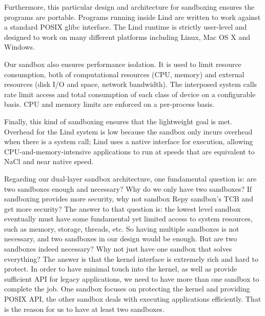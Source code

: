 Furthermore, this particular design and architecture for sandboxing ensures the programs are portable. 
Programs running inside Lind are written to work against a standard POSIX glibc interface. 
The Lind runtime is strictly user-level and designed to work on many different platforms including Linux, 
Mac OS X and Windows.

Our sandbox also ensures performance isolation. It is used to limit resource consumption, 
both of computational resources (CPU, memory) and external resources (disk I/O and space, 
network bandwidth). The interposed system calls rate limit access and total consumption of 
each class of device on a configurable basis. CPU and memory limits are enforced on 
a per-process basis. 

Finally, this kind of sandboxing ensures that the lightweight goal is met. Overhead for the Lind system 
is low because the sandbox only incurs overhead when there is a system call; Lind uses a native interface 
for execution, allowing CPU-and-memory-intensive applications to run at speeds that are equivalent 
to NaCl and near native speed. 

Regarding our dual-layer sandbox architecture, one fundamental question is: are two sandboxes 
enough and necessary? Why do we only have two sandboxes? If sandboxing provides more security, 
why not sandbox Repy sandbox's TCB and get more security? The answer to that question is: 
the lowest level sandbox eventually must have some fundamental yet limited access to system resources, 
such as memory, storage, threads, etc. So having multiple sandboxes is not necessary, and two sandboxes in 
our design would be enough. But are two sandboxes indeed necessary? Why not just have one sandbox 
that solves everything? The answer is that the kernel interface is extremely rich and hard to protect. 
In order to have minimal touch into the kernel, as well as provide sufficient API for legacy applications, 
we need to have more than one sandbox to complete the job. One sandbox focuses on protecting 
the kernel and providing POSIX API, the other sandbox deals with executing applications efficiently. 
That is the reason for us to have at least two sandboxes.  